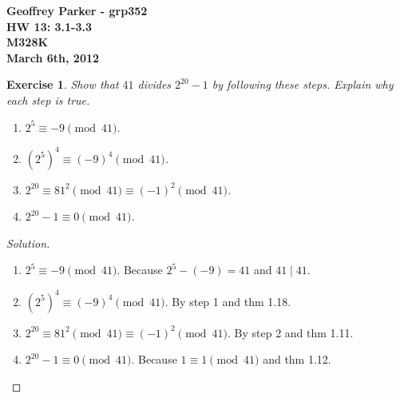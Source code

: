 \documentclass[12pt,leqno]{article}
\numberwithin{equation}{section}
\newtheorem{exer}[thm]{Exercise}
\theoremstyle{definition}
\begin{document}
\thispagestyle{plain}
\begin{flushright}
\large{\textbf{Geoffrey Parker - grp352 \\
HW 13: 3.1-3.3\\
M328K \\
March 6th, 2012 \\}}
\end{flushright}

\markboth{}{} \setcounter{section}{0} \baselineskip=18pt

\setcounter{tocdepth}{4}



\setcounter{section}{3}

\setcounter{thm}{0}


\begin{exer}
Show that $41$ divides $2^{20}-1$ by following these steps.  Explain
why each step is true.
\begin{enumerate} \item $2^5 \equiv -9 \pmod{41}$.  \item $(2^5)^4
\equiv (-9)^4 \pmod{41}$.  \item $2^{20} \equiv 81^2 \pmod{41}
\equiv (-1)^2\pmod{41}$.  \item $2^{20} - 1 \equiv 0 \pmod{41}$.
\end{enumerate}
\end{exer}

\begin{proof}[Solution]
$ $\\
\begin{enumerate}
\item $2^5 \equiv -9 \pmod{41}$.  Because $2^5 - (-9) = 41$ and $41 \mid 41$.
\item $(2^5)^4 \equiv (-9)^4 \pmod{41}$.  By step 1 and thm 1.18.
\item $2^{20} \equiv 81^2 \pmod{41} \equiv (-1)^2\pmod{41}$.  By step 2 and thm 1.11.
\item $2^{20} - 1 \equiv 0 \pmod{41}$. Because $1 \equiv 1 \pmod{41}$ and thm 1.12.
\end{enumerate}
\end{proof}
\end{document}
